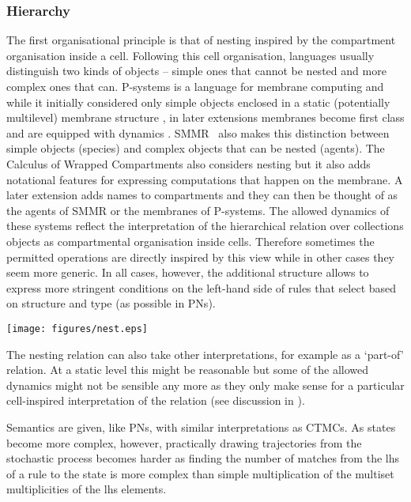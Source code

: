 \documentclass[phd]{infthesis}
\begin{document}
\subsubsection*{Hierarchy}
The first organisational principle is that of nesting inspired by the
compartment organisation inside a cell. Following this cell organisation,
languages usually distinguish two kinds of objects -- simple ones that cannot be
nested and more complex ones that can. P-systems is a language for membrane
computing and while it initially considered only simple objects enclosed in a
static (potentially multilevel) membrane structure \citep{puaun2000computing},
in later extensions membranes become first class and are equipped with dynamics
\citep{puaun2001p}. SMMR~\citep{oury_multi-level_2013} also makes this
distinction between simple objects (species) and complex objects that can be
nested (agents). The Calculus of Wrapped Compartments \citep{coppo_stochastic}
also considers nesting but it also adds notational features for expressing
computations that happen on the membrane. A later extension
\citep{coppo_hybrid_2010} adds names to compartments and they can then be
thought of as the agents of SMMR or the membranes of P-systems. The allowed
dynamics of these systems reflect the interpretation of the hierarchical
relation over collections objects as compartmental organisation inside
cells. Therefore sometimes the permitted operations are directly inspired by
this view while in other cases they seem more generic. In all cases, however,
the additional structure allows to express more stringent conditions on the
left-hand side of rules that select based on structure and type (as possible in
PNs).
\begin{center}
    \texttt{[image: figures/nest.eps]}
  \end{center}  
The nesting relation can also take other interpretations, for example as a
`part-of' relation. At a static level this might be reasonable but some of the
allowed dynamics might not be sensible any more as they only make sense for a
particular cell-inspired interpretation of the relation (see discussion in
\citet{artale_part-whole_1996}).

Semantics are given, like PNs, with similar interpretations as
CTMCs. As states become more complex, however, practically drawing trajectories
from the stochastic process becomes harder as finding the number of matches from
the lhs of a rule to the state is more complex than simple multiplication of the
multiset multiplicities of the lhs elements.
\end{document}
